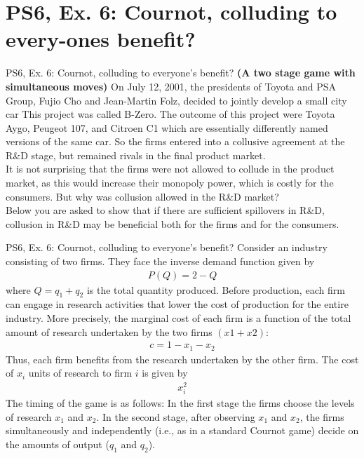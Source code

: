 \section{PS6, Ex. 6: Cournot, colluding to every-ones benefit?}

\begin{frame}{PS6, Ex. 6: Cournot, colluding to everyone's benefit?}
    \textbf{(A two stage game with simultaneous moves)} On July 12, 2001, the presidents of Toyota and PSA Group, Fujio Cho and Jean-Martin Folz, decided to jointly develop a small city car This project was called B-Zero. The outcome of this project were Toyota Aygo, Peugeot 107, and Citroen C1 which are essentially differently named versions of the same car. So the firms entered into a collusive agreement at the R\&D stage, but remained rivals in the final product market.\\\medskip It is not surprising that the firms were not allowed to collude in the product market, as this would increase their monopoly power, which is costly for the consumers. But why was collusion allowed in the R\&D market?\\\medskip
    Below you are asked to show that if there are sufficient spillovers in R\&D, collusion in R\&D may be beneficial both for the firms and for the consumers.
    \vfill\null
\end{frame}
\begin{frame}{PS6, Ex. 6: Cournot, colluding to everyone's benefit?}
    Consider an industry consisting of two firms. They face the inverse demand function given by
    \begin{align*}
      P(Q)=2-Q
    \end{align*}
    where $Q = q_1 + q_2$ is the total quantity produced. Before production, each firm can engage in research activities that lower the cost of production for the entire industry. More precisely, the marginal cost of each firm is a function of the total amount of research undertaken by the two firms $(x1 + x2)$:
    \begin{align*}
      c=1-x_1-x_2
    \end{align*}
    Thus, each firm benefits from the research undertaken by the other firm. The cost of $x_i$ units of research to firm $i$ is given by
    \begin{align*}
      x_i^2
    \end{align*}
    The timing of the game is as follows: In the first stage the firms choose the levels of research $x_1$ and $x_2$. In the second stage, after observing $x_1$ and $x_2$, the firms simultaneously and independently (i.e., as in a standard Cournot game) decide on the amounts of output ($q_1$ and $q_2$).
    \vfill\null
\end{frame}

